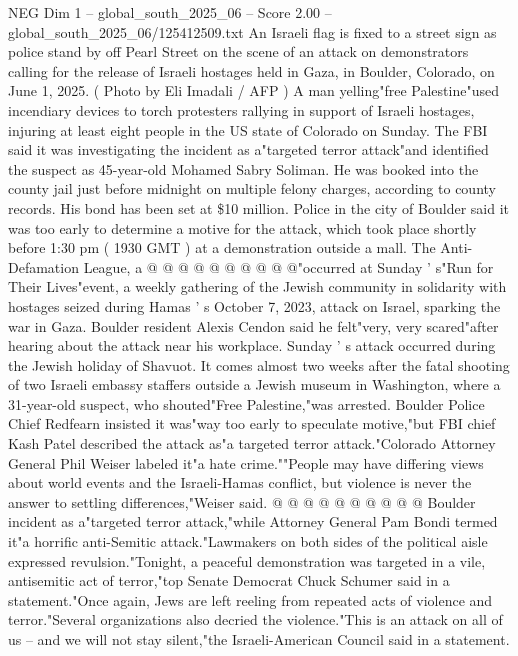 \begin{textsample}{NEG Dim 1 – global\_south\_2025\_06 – Score 2.00 – global\_south\_2025\_06/125412509.txt}  \label{ex:f1_neg_318}
An Israeli flag is fixed to a street sign as police stand by off Pearl Street on the scene of an attack on demonstrators calling for the release of Israeli hostages held in Gaza, in Boulder, Colorado, on June 1, 2025. ( Photo by Eli Imadali / AFP ) A man yelling"free Palestine"used incendiary devices to torch protesters rallying in support of Israeli hostages, injuring at least eight people in the US state of Colorado on Sunday.
The FBI said it was investigating the incident as a"targeted terror attack"and identified the suspect as 45-year-old Mohamed Sabry Soliman.
He was booked into the county jail just before midnight on multiple felony charges, according to county records.
His bond has been set at \$10 million.
Police in the city of Boulder said it was too early to determine a motive for the attack, which took place shortly before 1:30 pm ( 1930 GMT ) at a demonstration outside a mall.
The Anti-Defamation League, a @ @ @ @ @ @ @ @ @ @"occurred at Sunday ' s"Run for Their Lives"event, a weekly gathering of the Jewish community in solidarity with hostages seized during Hamas ' s October 7, 2023, attack on Israel, sparking the war in Gaza.
Boulder resident Alexis Cendon said he felt"very, very scared"after hearing about the attack near his workplace.
Sunday ' s attack occurred during the Jewish holiday of Shavuot.
It comes almost two weeks after the fatal shooting of two Israeli embassy staffers outside a Jewish museum in Washington, where a 31-year-old suspect, who shouted"Free Palestine,"was arrested.
Boulder Police Chief Redfearn insisted it was"way too early to speculate motive,"but FBI chief Kash Patel described the attack as"a targeted terror attack."Colorado Attorney General Phil Weiser labeled it"a hate crime.""People may have differing views about world events and the Israeli-Hamas conflict, but violence is never the answer to settling differences,"Weiser said. @ @ @ @ @ @ @ @ @ @ Boulder incident as a"targeted terror attack,"while Attorney General Pam Bondi termed it"a horrific anti-Semitic attack."Lawmakers on both sides of the political aisle expressed revulsion."Tonight, a peaceful demonstration was targeted in a vile, antisemitic act of terror,"top Senate Democrat Chuck Schumer said in a statement."Once again, Jews are left reeling from repeated acts of violence and terror."Several organizations also decried the violence."This is an attack on all of us -- and we will not stay silent,"the Israeli-American Council said in a statement.

\end{textsample}

